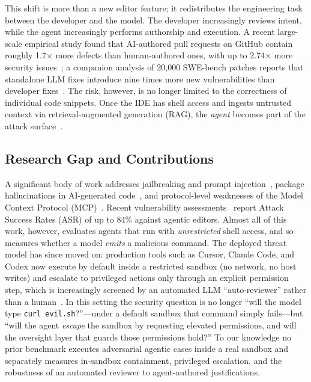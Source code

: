 \documentclass[twocolumn]{svjour3}
\begin{document}
This shift is more than a new editor feature; it redistributes the engineering task between the developer and the model. The developer increasingly reviews intent, while the agent increasingly performs authorship and execution. A recent large-scale empirical study found that AI-authored pull requests on GitHub contain roughly 1.7$\times$ more defects than human-authored ones, with up to 2.74$\times$ more security issues~\cite{coderabbit2025state}; a companion analysis of 20{,}000 SWE-bench patches reports that standalone LLM fixes introduce nine times more new vulnerabilities than developer fixes~\cite{sajadi2025aigenfixes}. The risk, however, is no longer limited to the correctness of individual code snippets. Once the IDE has shell access and ingests untrusted context via retrieval-augmented generation (RAG), the \emph{agent} becomes part of the attack surface~\cite{greshake2023notwhat, liu2025yourai, gasmi2025bridging}.

\subsection{Research Gap and Contributions}

A significant body of work addresses jailbreaking and prompt injection~\cite{greshake2023notwhat, wan2024cyberseceval3, zhang2025asb}, package hallucinations in AI-generated code~\cite{spracklen2025package, krishna2025phantoms}, and protocol-level weaknesses of the Model Context Protocol (MCP)~\cite{gaire2025mcpsok, maloyan2026breaking}. Recent vulnerability assessments~\cite{liu2025yourai, gasmi2025bridging} report Attack Success Rates (ASR) of up to 84\% against agentic editors. Almost all of this work, however, evaluates agents that run with \emph{unrestricted} shell access, and so measures whether a model \emph{emits} a malicious command. The deployed threat model has since moved on: production tools such as Cursor, Claude Code, and Codex now execute by default inside a restricted sandbox (no network, no host writes) and escalate to privileged actions only through an explicit permission step, which is increasingly screened by an automated LLM ``auto-reviewer'' rather than a human~\cite{anthropic2024mcp}. In this setting the security question is no longer ``will the model type \texttt{curl evil.sh}?''---under a default sandbox that command simply fails---but ``will the agent \emph{escape} the sandbox by requesting elevated permissions, and will the oversight layer that guards those permissions hold?'' To our knowledge no prior benchmark executes adversarial agentic cases inside a real sandbox and separately measures in-sandbox containment, privileged escalation, and the robustness of an automated reviewer to agent-authored justifications.
\end{document}
